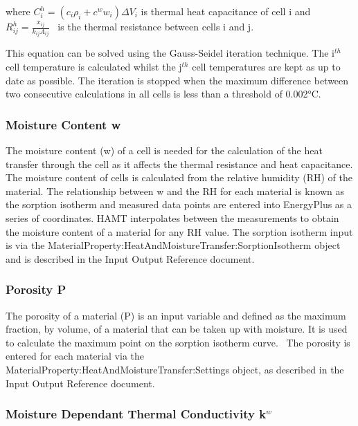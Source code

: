 where \(C_i^h = \left( {{c_i}{\rho_i} + {c^w}{w_i}} \right)\Delta {V_i}\) is thermal heat capacitance of cell i and \(R_{ij}^h = \frac{x_{ij}}{k_{ij}A_{ij}}\) ~is the thermal resistance between cells i and j.

This equation can be solved using the Gauss-Seidel iteration technique. The i\(^{th}\) cell temperature is calculated whilst the j\(^{th}\) cell temperatures are kept as up to date as possible. The iteration is stopped when the maximum difference between two consecutive calculations in all cells is less than a threshold of 0.002°C.

\subsubsection{Moisture Content w}\label{moisture-content-w}

The moisture content (w) of a cell is needed for the calculation of the heat transfer through the cell as it affects the thermal resistance and heat capacitance. The moisture content of cells is calculated from the relative humidity (RH) of the material. The relationship between w and the RH for each material is known as the sorption isotherm and measured data points are entered into EnergyPlus as a series of coordinates. HAMT interpolates between the measurements to obtain the moisture content of a material for any RH value. The sorption isotherm input is via the MaterialProperty:HeatAndMoistureTransfer:SorptionIsotherm object and is described in the Input Output Reference document.

\subsubsection{Porosity P}\label{porosity-p}

The porosity of a material (P) is an input variable and defined as the maximum fraction, by volume, of a material that can be taken up with moisture. It is used to calculate the maximum point on the sorption isotherm curve. ~The porosity is entered for each material via the MaterialProperty:HeatAndMoistureTransfer:Settings object, as described in the Input Output Reference document.

\subsubsection{\texorpdfstring{Moisture Dependant Thermal Conductivity k\(^{w}\)}{Moisture Dependant Thermal Conductivity k\^{}\{w\}}}\label{moisture-dependant-thermal-conductivity-kw}

